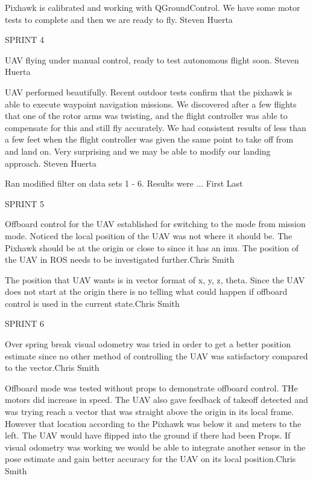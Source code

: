 \begin{description}
\item [1/4/16]  Pixhawk is calibrated and working with QGroundControl. We have some motor tests to complete and then we are ready to fly. \hfill{Steven Huerta}

\item SPRINT 4

\item [1/18/16]  UAV flying under manual control, ready to test autonomous flight soon. \hfill{Steven Huerta}

\item [1/25/16]  UAV performed beautifully. Recent outdoor tests confirm that the pixhawk is able to execute waypoint navigation missions. We discovered after a few flights that one of the rotor arms was twisting, and the flight controller was able to compensate for this and still fly accurately. We had consistent results of less than a few feet when the flight controller was given the same point to take off from and land on. Very surprising and we may be able to modify our landing approach.  \hfill{Steven Huerta}

\item [2/1/16]  Ran modified filter on data sets 1 - 6.  Results were ... \hfill{First Last}

\item SPRINT 5

\item [2/15/16]  Offboard control for the UAV established for switching to the mode from mission mode. Noticed the local position of the UAV was not where it should be. The Pixhawk should be at the origin or close to since it has an imu. The position of the UAV in ROS needs to be investigated further.\hfill{Chris Smith}

\item [2/22/16]  The position that UAV wants is in vector format of x, y, z, theta. Since the UAV does not start at the origin there is no telling what could happen if offboard control is used in the current state.\hfill{Chris Smith}

\item SPRINT 6

\item [3/21/16]  Over spring break visual odometry was tried in order to get a better position estimate since no other method of controlling the UAV was satisfactory compared to the vector.\hfill{Chris Smith}

\item [3/28/16]  Offboard mode was tested without props to demonstrate offboard control. THe motors did increase in speed. The  UAV also gave feedback of takeoff detected and was trying reach a vector that was straight above the origin in its local frame. However that location according to the Pixhawk was below it and meters to the left. The UAV would have flipped into the ground if there had been Props. If visual odometry was working we would be able to integrate another sensor in the pose estimate and gain better accuracy for the UAV on its local position.\hfill{Chris Smith}
\end{description}